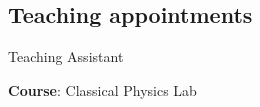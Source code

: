 \documentclass[10pt]{article} %
\begin{document}
\begin{paracol}{1}





	

	






	


\section{Teaching appointments} 
	{Teaching Assistant}
	{\textbf{Course}: Classical Physics Lab
	
}
\end{paracol}
\end{document}
